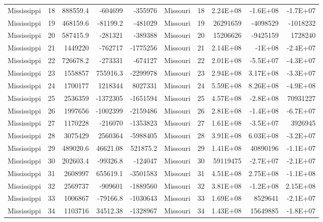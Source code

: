 \begin{table}[]
\begin{tabular}{lrrrrlrrrr}
		Mississippi &  18 & 888559.4 & -604699 & -355976 & Missouri &  18 & 2.24E+08 & -1.6E+08 & -1.7E+07 \\
		Mississippi &  19 & 468159.6 & -81199.2 & -481029 & Missouri &  19 & 26291659 & -4098529 & -1018232 \\
		Mississippi &  20 & 587415.9 & -281321 & -389388 & Missouri &  20 & 15206626 & -9425159 & 1728240 \\
		Mississippi &  21 & 1449220 & -762717 & -1775256 & Missouri &  21 & 2.14E+08 & -1E+08 & -2.4E+07 \\
		Mississippi &  22 & 726678.2 & -273331 & -674127 & Missouri &  22 & 2.01E+08 & -5.5E+07 & -4.3E+07 \\
		Mississippi &  23 & 1558857 & 755916.3 & -2299978 & Missouri &  23 & 2.94E+08 & 3.17E+08 & -3.3E+07 \\
		Mississippi &  24 & 1700177 & 1218344 & 8027331 & Missouri &  24 & 5.59E+08 & 8.26E+08 & -4.9E+08 \\
		Mississippi &  25 & 2536359 & -1372305 & -1651594 & Missouri &  25 & 4.57E+08 & -2.8E+08 & 70931227 \\
		Mississippi &  26 & 1997656 & -1002399 & -2159486 & Missouri &  26 & 2.81E+08 & -1.4E+08 & -6.7E+07 \\
		Mississippi &  27 & 1170228 & -216070 & -1353823 & Missouri &  27 & 1.61E+08 & -3.5E+07 & 3926945 \\
		Mississippi &  28 & 3075429 & 2560364 & -5988405 & Missouri &  28 & 3.91E+08 & 6.03E+08 & -3.2E+07 \\
		Mississippi &  29 & 489020.6 & 46621.08 & 521875.2 & Missouri &  29 & 1.41E+08 & 40890196 & -1.1E+07 \\
		Mississippi &  30 & 202603.4 & -99326.8 & -124047 & Missouri &  30 & 59119475 & -2.7E+07 & -2.1E+07 \\
		Mississippi &  31 & 2608997 & 655619.1 & -3501583 & Missouri &  31 & 4.51E+08 & 2.75E+08 & -1.1E+08 \\
		Mississippi &  32 & 2569737 & -909601 & -1889560 & Missouri &  32 & 3.81E+08 & -1.2E+08 & 2.15E+08 \\
		Mississippi &  33 & 1006867 & -79166.8 & -1030643 & Missouri &  33 & 1.69E+08 & 8529641 & -2.1E+07 \\
		Mississippi &  34 & 1103716 & 34512.38 & -1328967 & Missouri &  34 & 1.43E+08 & 15649885 & -1.8E+07
	\end{tabular}
\end{table}

